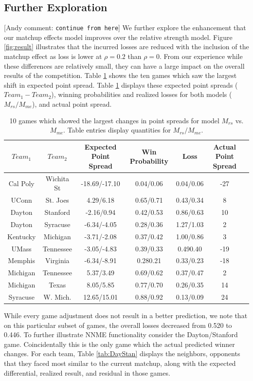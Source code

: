 \documentclass[letterpaper,12pt]{article}
\newcommand{\andyc}[1]{[{\color{red}\sc Andy comment: {\tt #1}}]}
\begin{document}
\subsection{Further Exploration}
\andyc{continue from here}
We further explore the enhancement that our matchup effects model improves over the relative strength model.  Figure \ref{fig:result} illustrates that the incurred losses are reduced with the inclusion of the matchup effect as loss is lower at $\rho=0.2$ than $\rho=0$. From our experience while these differences are relatively small, they can have a large impact on the overall results of the competition. Table \ref{tab:change} shows the ten games which saw the largest shift in expected point spread. Table \ref{tab:change} displays these expected point spreads ($Team_1 - Team_2$), winning probabilities and realized losses for both models ($M_{rs}/M_{me}$), and actual point spread. 
\begin{table}[h!]
\caption{10 games which showed the largest changes in point spreads for model $M_{rs}$ vs. $M_{me}$. Table entries display quantities for $M_{rs}/M_{me}$.\label{tab:change}}
\scriptsize
\centering
\begin{tabular}{|cc | ccc |c|c|}
  \hline
  \hline
 $Team_1$ & $Team_2$ & Expected Point Spread & Win Probability & Loss & Actual Point Spread\\ 
  \hline
 Cal Poly & Wichita St & -18.69/-17.10  & 0.04/0.06 & 0.04/0.06&  -27\\ 
 UConn & St. Joes &4.29/6.18 & 0.65/0.71 & 0.43/0.34  & 8\\ 
 Dayton & Stanford & -2.16/0.94 & 0.42/0.53 & 0.86/0.63& 10 \\ 
 Dayton & Syracuse & -6.34/-4.05 & 0.28/0.36 & 1.27/1.03& 2\\ 
 Kentucky & Michigan & -3.71/-2.08 & 0.37/0.42 & 1.00/0.86 & 3\\ 
 UMass & Tennessee &-3.05/-4.83 & 0.39/0.33 & 0.490.40 & -19\\ 
 Memphis & Virginia & -6.34/-8.91 & 0.280.21 & 0.33/0.23 & -18\\ 
 Michigan & Tennessee & 5.37/3.49 & 0.69/0.62 & 0.37/0.47 & 2\\ 
 Michigan & Texas & 8.05/5.85 & 0.77/0.70 & 0.26/0.35 & 14\\ 
 Syracuse & W. Mich. & 12.65/15.01 & 0.88/0.92 & 0.13/0.09& 24\\ 
   \hline
   \hline
\end{tabular}
\end{table}
While every game adjustment does not result in a better prediction,  we note that on this particular subset of games, the overall losses decreased from 0.520 to 0.446. To further illustrate NNME functionality consider the Dayton/Stanford game.  Coincidentally this is the only game which the actual predicted winner changes. For each team, Table \ref{tab:DayStan} displays the neighbors, opponents that they faced most similar to the current matchup, along with the expected differential, realized result, and residual in those games. 
\end{document}
